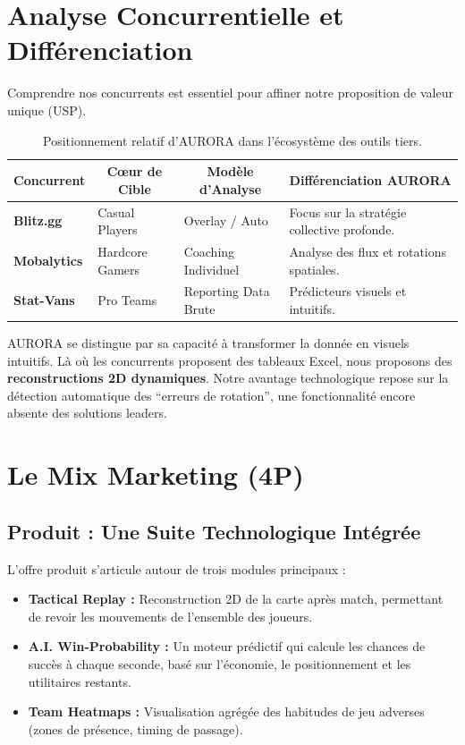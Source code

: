 \documentclass[a4paper,11pt]{article}
\begin{document}
\newpage

\section{Analyse Concurrentielle et Différenciation}
Comprendre nos concurrents est essentiel pour affiner notre proposition de valeur unique (USP).

\begin{table}[h]
\centering
\small
\renewcommand{\arraystretch}{1.5}
\begin{tabularx}{\textwidth}{|l|l|l|X|}
\hline
\rowcolor{academic-blue!10} \textbf{Concurrent} & \multicolumn{1}{c|}{\textbf{Cœur de Cible}} & \multicolumn{1}{c|}{\textbf{Modèle d'Analyse}} & \multicolumn{1}{c|}{\textbf{Différenciation AURORA}} \\ \hline
\textbf{Blitz.gg} & Casual Players & Overlay / Auto & Focus sur la stratégie collective profonde. \\ \hline
\textbf{Mobalytics} & Hardcore Gamers & Coaching Individuel & Analyse des flux et rotations spatiales. \\ \hline
\textbf{Stat-Vans} & Pro Teams & Reporting Data Brute & Prédicteurs visuels et intuitifs. \\ \hline
\end{tabularx}
\caption{Positionnement relatif d'AURORA dans l'écosystème des outils tiers.}
\end{table}

AURORA se distingue par sa capacité à transformer la donnée en visuels intuitifs. Là où les concurrents proposent des tableaux Excel, nous proposons des \textbf{reconstructions 2D dynamiques}. Notre avantage technologique repose sur la détection automatique des \enquote{erreurs de rotation}, une fonctionnalité encore absente des solutions leaders.

\section{Le Mix Marketing (4P)}
\subsection{Produit : Une Suite Technologique Intégrée}
L'offre produit s'articule autour de trois modules principaux :
\begin{itemize}
    \item \textbf{Tactical Replay :} Reconstruction 2D de la carte après match, permettant de revoir les mouvements de l'ensemble des joueurs.
    \item \textbf{A.I. Win-Probability :} Un moteur prédictif qui calcule les chances de succès à chaque seconde, basé sur l'économie, le positionnement et les utilitaires restants.
    \item \textbf{Team Heatmaps :} Visualisation agrégée des habitudes de jeu adverses (zones de présence, timing de passage).
\end{itemize}
\end{document}
